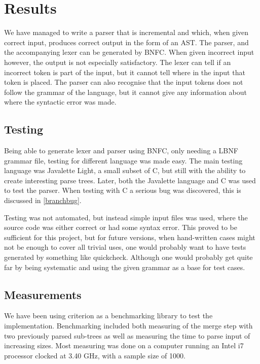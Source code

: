 \documentclass[a4paper,12pt,twosided]{report}
\begin{document}
%
%

\chapter{Results}
We have managed to write a parser that is incremental and which, when given
correct input, produces correct output in the form of an AST. The parser, and
the accompanying lexer can be generated by BNFC. When given incorrect input
however, the output is not especially satisfactory. The lexer can tell if an
incorrect token is part of the input, but it cannot tell where in the input that
token is placed. The parser can also recognise that the input tokens does not
follow the grammar of the language, but it cannot give any information about
where the syntactic error was made.

\section{Testing}
Being able to generate lexer and parser using BNFC, only needing a LBNF grammar
file, testing for different language was made easy. The main testing language
was Javalette Light, a small subset of C, but still with the ability to create
interesting parse trees. Later, both the Javalette language and C was used to
test the parser. When testing with C a serious bug was discovered, this is
discussed in \ref{branchbug}.

Testing was not automated, but instead simple input files was used, where the
source code was either correct or had some syntax error. This proved to be
sufficient for this project, but for future versions, when hand-written cases
might not be enough to cover all trivial uses, one would probably want to have
tests generated by something like quickcheck. Although one would probably get
quite far by being systematic and using the given grammar as a base for test
cases. %

\section{Measurements}
We have been using criterion as a benchmarking library to test the
implementation. Benchmarking included both measuring of the merge step with two
previously parsed sub-trees as well as measuring the time to parse input of
increasing sizes. Most measuring was done on a computer running an Intel i7
processor clocked at 3.40 GHz, with a sample size of 1000. 
\end{document}
